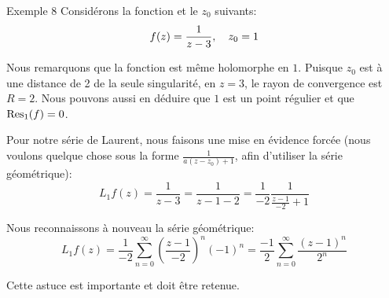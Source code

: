 \documentclass[a4paper]{article}
\begin{document}
\begin{parag}{Exemple 8}
    Considérons la fonction et le $z_0$ suivants: 
    \[f\left(z\right) = \frac{1}{z-3}, \mathspace z_0 = 1\]
    
    Nous remarquons que la fonction est même holomorphe en $1$. Puisque $z_{0}$ est à une distance de 2 de la seule singularité, en $z = 3$, le rayon de convergence est $R = 2$. Nous pouvons aussi en déduire que $1$ est un point régulier et que $\Res_1\left(f\right) = 0$.

    Pour notre série de Laurent, nous faisons une mise en évidence forcée (nous voulons quelque chose sous la forme $\frac{1}{a\left(z-z_0\right) + 1}$, afin d'utiliser la série géométrique): 
    \[L_1 f\left(z\right) = \frac{1}{z-3} = \frac{1}{z - 1 -2} = \frac{1}{-2} \frac{1}{\frac{z-1}{-2} + 1}\]

    Nous reconnaissons à nouveau la série géométrique: 
    \[L_1 f\left(z\right) = \frac{1}{-2} \sum_{n=0}^{\infty} \left(\frac{z-1}{-2}\right)^n \left(-1\right)^n = \frac{-1}{2} \sum_{n=0}^{\infty} \frac{\left(z-1\right)^n}{2^n}\]
    
    Cette astuce est importante et doit être retenue.
\end{parag}
\end{document}
